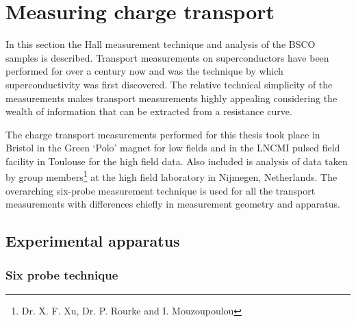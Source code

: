 
\section{Measuring charge transport}

In this section the Hall measurement technique and analysis of the \ac{BSCO} samples is described. Transport measurements on superconductors have been performed for over a century now and was the technique by which superconductivity was first discovered. The relative technical simplicity of the measurements makes transport measurements highly appealing considering the wealth of information that can be extracted from a resistance curve.

The charge transport measurements performed for this thesis took place in Bristol in the Green `Polo' magnet for low fields and in the \ac{LNCMI} pulsed field facility in Toulouse for the high field data. Also included is analysis of data taken by group members\footnote{Dr. X. F. Xu, Dr. P. Rourke and I. Mouzoupoulou} at the high field laboratory in Nijmegen, Netherlands. The overarching six-probe measurement technique is used for all the transport measurements with differences chiefly in measurement geometry and apparatus.

\subsection{Experimental apparatus}

\subsubsection{Six probe technique}


